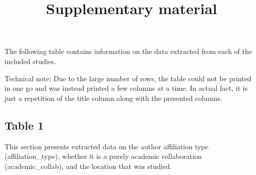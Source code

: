 \documentclass[
]{article}
\title{Supplementary material}
\author{}
\date{\vspace{-2.5em}}
\begin{document}
\maketitle

The following table contains information on the data extracted from each
of the included studies.

Technical note: Due to the large number of rows, the table could not be
printed in one go and was instead printed a few columns at a time. In
actual fact, it is just a repetition of the title column along with the
presented columns.

\hypertarget{table-1}{%
\subsection{Table 1}\label{table-1}}

This section presents extracted data on the author affiliation type
(affiliation\_type), whether it is a purely academic collaboration
(academic\_collab), and the location that was studied.
\end{document}
